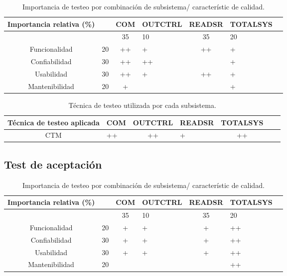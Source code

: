 \documentclass[
11pt, %
]{charter}
\begin{document}
\begin{table}[ht]
    \centering
    \begin{tabularx}{\linewidth}{@{}|c|X|c|X|c|X|c|@{}}\hline \hline
    \rowcolor[HTML]{d6c6c3}
 Importancia relativa (\%)& &  COM & OUTCTRL & READSR & TOTALSYS\\
        \hline
       
            &  &35 & 10 &35 & 20                          \\
        Funcionalidad    & 20 & ++ & + & ++ & +		\\
        Confiabilidad    & 30 & ++ & ++ & & +                        \\
        Usabilidad       & 30 & ++ & + & ++ & +                        \\
        Mantenibilidad   & 20 & + & &  & +                        \\
        \hline
    \end{tabularx}
    \caption{Importancia de testeo por combinación de subsistema/ característic de calidad.}
\end{table}


\begin{table}[ht]
    \centering
    \begin{tabularx}{\linewidth}{@{}|c|X|c|X|c|X|c|@{}}\hline \hline
    \rowcolor[HTML]{d6c6c3}
 Técnica de testeo aplicada & COM & OUTCTRL & READSR & TOTALSYS\\
        \hline
      CTM & ++ &++ &+ & ++ \\
        \hline
    \end{tabularx}
    \caption{Técnica de testeo utilizada por cada subsistema.}
\end{table}

\subsection{Test de aceptación}

\begin{table}[ht]
    \centering
    \begin{tabularx}{\linewidth}{@{}|c|X|c|X|c|X|c|@{}}\hline \hline
    \rowcolor[HTML]{d6c6c3}
 Importancia relativa (\%)& &  COM & OUTCTRL & READSR & TOTALSYS\\
        \hline
       
            &  &35 & 10 &35 & 20                          \\
        Funcionalidad    & 20 & + & + & + & ++		\\
        Confiabilidad    & 30 & + & + & + & ++                        \\
        Usabilidad       & 30 & + & + & + & ++                        \\
        Mantenibilidad   & 20 &  & &  & ++                        \\
        \hline
    \end{tabularx}
    \caption{Importancia de testeo por combinación de subsistema/ característic de calidad.}
\end{table}
\end{document}
